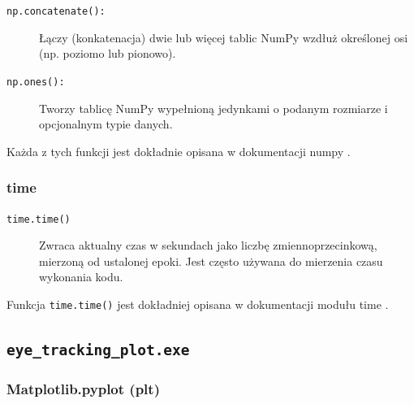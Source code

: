 \documentclass[a4paper,twoside,12pt]{book}
\begin{document}
\begin{description}
	\item[\texttt{np.concatenate():}] Łączy (konkatenacja) dwie lub więcej tablic NumPy wzdłuż określonej osi (np. poziomo lub pionowo).
	\item[\texttt{np.ones():}] Tworzy tablicę NumPy wypełnioną jedynkami o podanym rozmiarze i opcjonalnym typie danych.
\end{description}

Każda z tych funkcji jest dokładnie opisana w dokumentacji numpy \cite{bib:numpy-funkcje}.

\subsubsection{time}

\begin{description}
	\item[\texttt{time.time()}] Zwraca aktualny czas w sekundach jako liczbę zmiennoprzecinkową, mierzoną od ustalonej epoki. Jest często używana do mierzenia czasu wykonania kodu.
\end{description}

Funkcja \texttt{time.time()} jest dokładniej opisana w dokumentacji modułu time \cite{bib:time-Python}.

\subsection{\texttt{eye\_\-tracking\_\-plot\-.exe}}
\label{subsec:eye-tracking-plot.exe}

\subsubsection{Matplotlib.pyplot (plt)}
\end{document}
